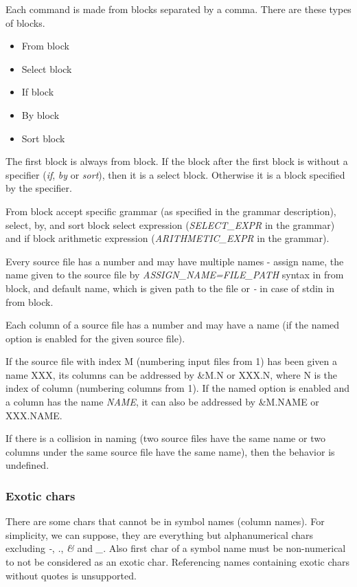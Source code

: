 Each command is made from blocks separated by a comma. There are these types of blocks.
\begin{itemize}
    \item From block
    \item Select block
    \item If block
    \item By block
    \item Sort block
\end{itemize}

The first block is always from block. If the block after the first block is without a specifier (\textit{if}, \textit{by} or \textit{sort}), then it is a select block. Otherwise it is a block specified by the specifier.

From block accept specific grammar (as specified in the grammar description), select, by, and sort block select expression (\textit{SELECT\_EXPR} in the grammar) and if block arithmetic expression (\textit{ARITHMETIC\_EXPR} in the grammar).

Every source file has a number and may have multiple names - assign name, the name given to the source file by \textit{ASSIGN\_NAME=FILE\_PATH} syntax in from block, and  
default name, which is given path to the file or \textit{-} in case of stdin in from block.

Each column of a source file has a number and may have a name (if the named option is enabled for the given source file).

If the source file with index M (numbering input files from 1) has been given a name XXX, its columns can be addressed by \&M.N or XXX.N, where N is the index of column (numbering columns from 1).  
If the named option is enabled and a column has the name \textit{NAME}, it can also be addressed by \&M.NAME or XXX.NAME.

If there is a collision in naming (two source files have the same name or two columns under the same source file have the same name), then the behavior is undefined.

\subsubsection{Exotic chars}
There are some chars that cannot be in symbol names (column names). For simplicity, we can suppose, they are everything but alphanumerical chars excluding \textit{-}, \textit{.}, \textit{\&} and \textit{\_}.  
Also first char of a symbol name must be non-numerical to not be considered as an exotic char.
Referencing names containing exotic chars without quotes is unsupported.

